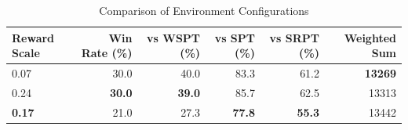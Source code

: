\begin{table}[htbp]%
\centering%
\begin{tabular}{lrrrrr}%
\toprule%
\textbf{Reward Scale}&\textbf{Win Rate (\%)}&\textbf{vs WSPT (\%)}&\textbf{vs SPT (\%)}&\textbf{vs SRPT (\%)}&\textbf{Weighted Sum}\\%
\midrule%
0.07&30.0&40.0&83.3&61.2&\textbf{13269}\\%
0.24&\textbf{30.0}&\textbf{39.0}&85.7&62.5&13313\\%
\textbf{0.17}&21.0&27.3&\textbf{77.8}&\textbf{55.3}&13442\\%
\bottomrule%
\end{tabular}%
\caption{Comparison of Environment Configurations}%
\label{tab:environment}%
\end{table}